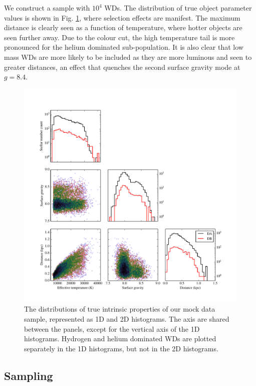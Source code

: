 \documentclass[fleqn,usenatbib]{mnras}
\begin{document}
We construct a sample with $10^4$ WDs. The distribution of true object parameter values is shown in Fig. \ref{fig:10000WDs}, where selection effects are manifest. The maximum distance is clearly seen as a function of temperature, where hotter objects are seen further away. Due to the colour cut, the high temperature tail is more pronounced for the helium dominated sub-population. It is also clear that low mass WDs are more likely to be included as they are more luminous and seen to greater distances, an effect that quenches the second surface gravity mode at $g=8.4$.
\begin{figure}
	\includegraphics[width=.9\textwidth]{sample_corner.pdf}
    \caption{The distributions of true intrinsic properties of our mock data sample, represented as 1D and 2D histograms. The axis are shared between the panels, except for the vertical axis of the 1D histograms. Hydrogen and helium dominated WDs are plotted separately in the 1D histograms, but not in the 2D histograms.}
    \label{fig:10000WDs}
\end{figure}


\subsection{Sampling}
\end{document}
